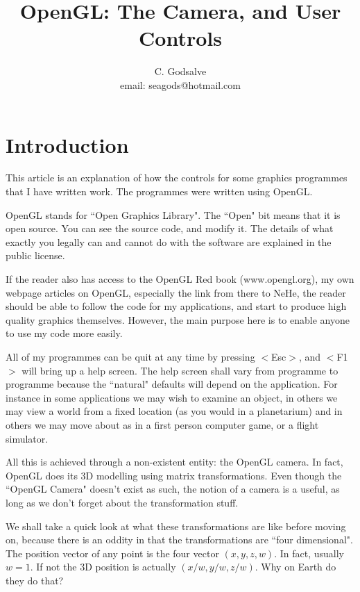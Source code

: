 \documentclass[12pt]{article}
\begin{document}

\thispagestyle{empty}


\title{OpenGL: The Camera,  and User Controls}

\author{C. Godsalve \\
   email: seagods@hotmail.com}

\maketitle

\tableofcontents


\section{Introduction}

This article is an explanation of how  the controls for
some graphics programmes
that I have written work. The programmes were written using OpenGL.


OpenGL stands for ``Open Graphics Library".
The ``Open" bit means that it is open source. You can see the
source code, and modify it. The details of what exactly you 
legally can and cannot do with the software are explained in
the public license.


If the reader also has access to the OpenGL Red book (www.opengl.org),
 my own webpage articles on OpenGL, especially the  link
from there to  NeHe, the reader should be able
 to follow the code for my applications, 
 and start to produce high quality graphics themselves.
 However, the main purpose here
is to enable anyone to use my code more easily.

All of my programmes can be quit at any time by pressing
 $<$Esc$>$,
 and $<$F1$>$ will bring up a help screen. The help screen
shall vary from programme to programme because the ``natural" 
defaults will depend on the application. For instance
in some applications we may wish to examine an object, in
others we may view a world from a fixed location (as you
would in a planetarium) and in others we may move about
as in a first person computer game, or a flight simulator.

All this is achieved through a non-existent entity: the OpenGL
camera. In fact, OpenGL does its 3D modelling using matrix
transformations. Even though the ``OpenGL Camera" doesn't exist
as such, the notion of a camera is a useful,
 as long as we don't forget about the transformation stuff.

We shall  take a quick look at what these transformations are
like before moving on, because there is an oddity in that
the transformations are ``four dimensional". The position
vector of any point is the four vector $(x, y, z, w)$.
In fact, usually $w=1$. If not the 3D position is actually
 $(x/w, y/w, z/w)$. Why on Earth do they do that?
\end{document}
